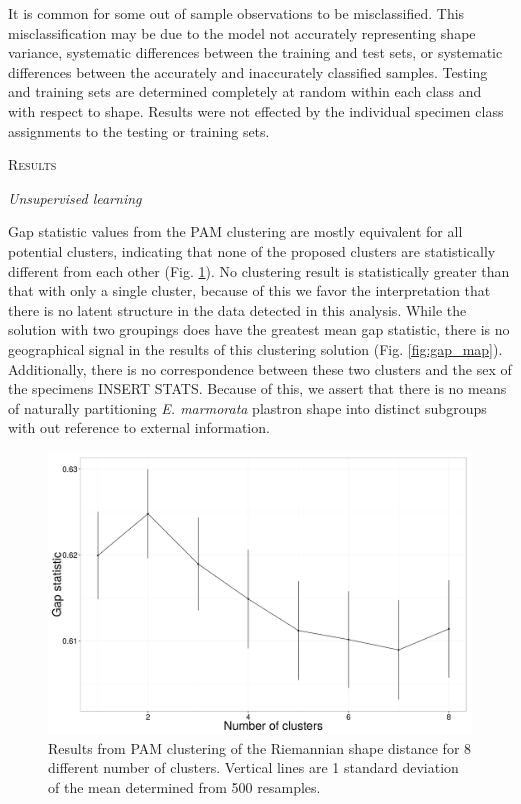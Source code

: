 \documentclass[12pt,letterpaper]{article}
\renewcommand{\section}[1]{%
\bigskip
\begin{center}
\begin{Large}
\normalfont\scshape #1
\medskip
\end{Large}
\end{center}}
\renewcommand{\subsection}[1]{%
\bigskip
\begin{center}
\begin{large}
\normalfont\itshape #1
\end{large}
\end{center}}
\begin{document}
It is common for some out of sample observations to be misclassified. This misclassification may be due to the model not accurately representing shape variance, systematic differences between the training and test sets, or systematic differences between the accurately and inaccurately classified samples. Testing and training sets are determined completely at random within each class and with respect to shape. Results were not effected by the individual specimen class assignments to the testing or training sets.



\section{Results}

\subsection{Unsupervised learning}

Gap statistic values from the PAM clustering are mostly equivalent for all potential clusters, indicating that none of the proposed clusters are statistically different from each other (Fig. \ref{fig:gap}). No clustering result is statistically greater than that with only a single cluster, because of this we favor the interpretation that there is no latent structure in the data detected in this analysis. While the solution with two groupings does have the greatest mean gap statistic, there is no geographical signal in the results of this clustering solution (Fig. \ref{fig:gap_map}). Additionally, there is no correspondence between these two clusters and the sex of the specimens INSERT STATS. Because of this, we assert that there is no means of naturally partitioning \textit{E. marmorata} plastron shape into distinct subgroups with out reference to external information.

\begin{figure}[h]
  \centering
  \includegraphics[height = 0.5\textheight, width = \textwidth, keepaspectratio = true]{figure/gap_res}
  \caption{Results from PAM clustering of the Riemannian shape distance for 8 different number of clusters. Vertical lines are 1 standard deviation of the mean determined from 500 resamples.}
  \label{fig:gap}
\end{figure}
\end{document}
